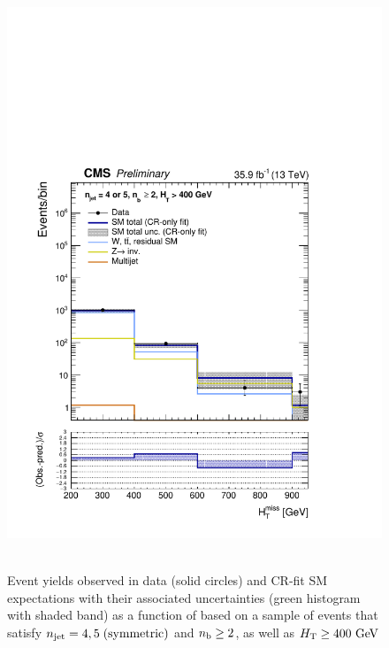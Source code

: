 \clearpage
\begin{figure}[h!]
  \centering
  \caption{Event yields observed in data (solid circles) and CR-fit SM expectations with their associated uncertainties 
  (green histogram with shaded band) as a function of \HTmiss based on a sample of events that satisfy 
  $n_{\text{jet}} = 4, 5 \; \textrm{(symmetric)}$ and $n_{\text{b}} \geq 2$, as well as $\mbox{$H_\text{T}$} \geq 400 \textrm{ GeV}$ }
  \includegraphics[width=0.8\linewidth]{figures/results/36invfb_preapproval/aggregated/postFitShapeCR/mhtShape_ge2b_eq45j_400_Inf_crfit.pdf} ~
\end{figure}

